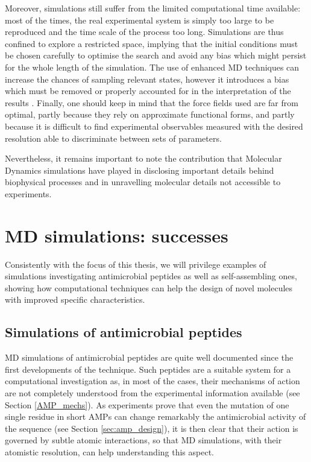 Moreover, simulations still suffer from the limited computational time available: most of the times, the real experimental system is simply too large to be reproduced and the time scale of the process too long. Simulations are thus confined to explore a restricted space, implying that the initial conditions must be chosen carefully to optimise the search and avoid any bias which might persist for the whole length of the simulation. The use of enhanced MD techniques can increase the chances of sampling relevant states, however it introduces a bias which must be removed or properly accounted for in the interpretation of the results \cite{Bernardi2015,Best2005,Barducci2010,Barducci2011,Mills2008}.
Finally, one should keep in mind that the force fields used are far from optimal, partly because they rely on approximate functional forms, and partly because it is difficult to find experimental observables measured with the desired resolution able to discriminate between sets of parameters.

Nevertheless, it remains important to note the contribution that Molecular Dynamics simulations have played in disclosing important details behind biophysical processes and in unravelling molecular details not accessible to experiments.


\section{MD simulations: successes} \label{sec:md_lit}
Consistently with the focus of this thesis, we will privilege examples of simulations investigating antimicrobial peptides as well as self-assembling ones, showing how computational techniques can help the design of novel molecules with improved specific characteristics.

\subsection{Simulations of antimicrobial peptides}
MD simulations of antimicrobial peptides are quite well documented since the first developments of the technique. Such peptides are a suitable system for a computational investigation as, in most of the cases, their mechanisms of action are not completely understood from the experimental information available (see Section \ref{AMP_mechs}). As experiments prove that even the mutation of one single residue in short AMPs can change remarkably the antimicrobial activity of the sequence (see Section \ref{sec:amp_design}), it is then clear that their action is governed by subtle atomic interactions, so that MD simulations, with their atomistic resolution, can help understanding this aspect.

